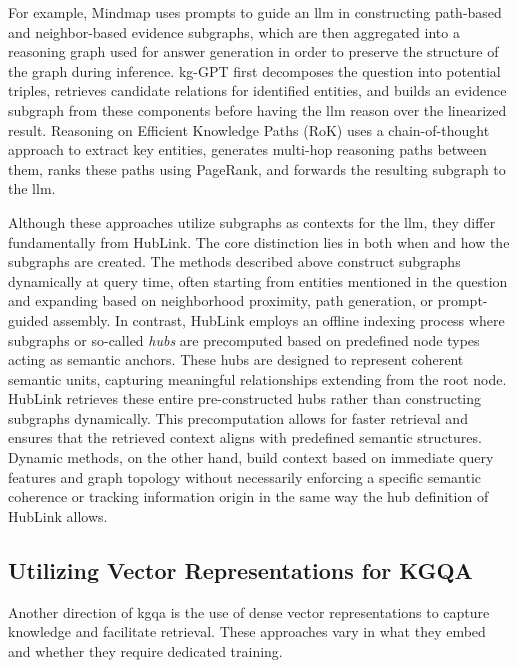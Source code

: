For example, Mindmap \cite{wen_mindmap_2024} uses prompts to guide an \gls{llm} in constructing path-based and neighbor-based evidence subgraphs, which are then aggregated into a reasoning graph used for answer generation in order to preserve the structure of the graph during inference. \gls{kg}-GPT \cite{kim_kg-gpt_2023} first decomposes the question into potential triples, retrieves candidate relations for identified entities, and builds an evidence subgraph from these components before having the \gls{llm} reason over the linearized result. Reasoning on Efficient Knowledge Paths (RoK) \cite{wang_reasoning_2024} uses a chain-of-thought approach to extract key entities, generates multi-hop reasoning paths between them, ranks these paths using PageRank, and forwards the resulting subgraph to the \gls{llm}.

Although these approaches utilize subgraphs as contexts for the \gls{llm}, they differ fundamentally from HubLink. The core distinction lies in both when and how the subgraphs are created. The methods described above construct subgraphs dynamically at query time, often starting from entities mentioned in the question and expanding based on neighborhood proximity, path generation, or prompt-guided assembly. In contrast, HubLink employs an offline indexing process where subgraphs or so-called \emph{hubs} are precomputed based on predefined node types acting as semantic anchors. These hubs are designed to represent coherent semantic units, capturing meaningful relationships extending from the root node. HubLink retrieves these entire pre-constructed hubs rather than constructing subgraphs dynamically. This precomputation allows for faster retrieval and ensures that the retrieved context aligns with predefined semantic structures. Dynamic methods, on the other hand, build context based on immediate query features and graph topology without necessarily enforcing a specific semantic coherence or tracking information origin in the same way the hub definition of HubLink allows.


\subsection{Utilizing Vector Representations for KGQA}
\label{sec:related_work_utilizing_vectors}

Another direction of \gls{kgqa} is the use of dense vector representations to capture knowledge and facilitate retrieval. These approaches vary in what they embed and whether they require dedicated training.


